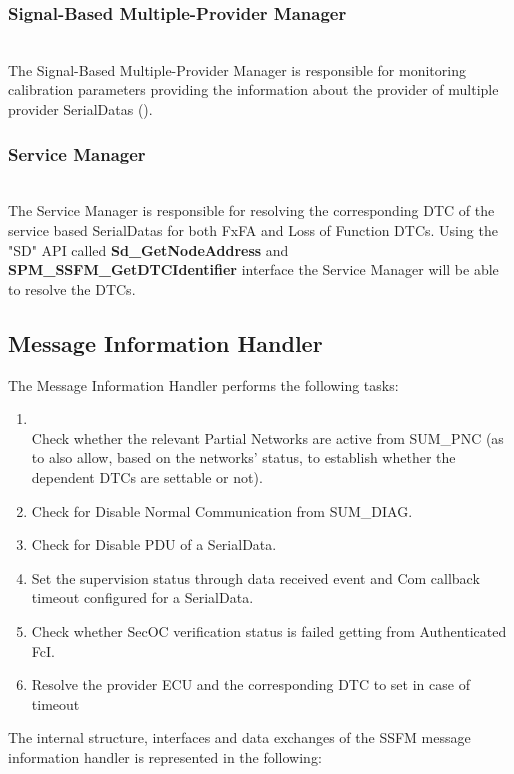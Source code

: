 \subsubsection{Signal-Based Multiple-Provider Manager}
\\
The Signal-Based Multiple-Provider Manager is responsible for monitoring calibration parameters providing the information
about the provider of multiple provider SerialDatas ().
\\
{
      
}

\subsubsection{Service Manager}

\\
The Service Manager is responsible for resolving the corresponding DTC of the service based SerialDatas for both FxFA and Loss of Function DTCs. Using the "SD" API called \textbf{Sd_GetNodeAddress} 
and \textbf{SPM_SSFM_GetDTCIdentifier} interface the Service Manager will be able to resolve the DTCs.
\\
{   }


\subsection{Message Information Handler}
The Message Information Handler performs the following tasks:
\begin{enumerate}
    \item {}
\\Check whether the relevant Partial Networks are active from SUM_PNC (as to also allow, based on the networks' status, to establish whether the dependent DTCs are settable or not).
\\
{     
}
    \item Check for Disable Normal Communication from SUM_DIAG.
    \item Check for Disable PDU of a SerialData.
    \item Set the supervision status through data received event and Com callback timeout configured for a SerialData.
    \item Check whether SecOC verification status is failed getting from Authenticated FcI.
    \item Resolve the provider ECU and the corresponding DTC to set in case of timeout
\end{enumerate}
The internal structure, interfaces and data exchanges of the SSFM message information handler is represented in the following:

